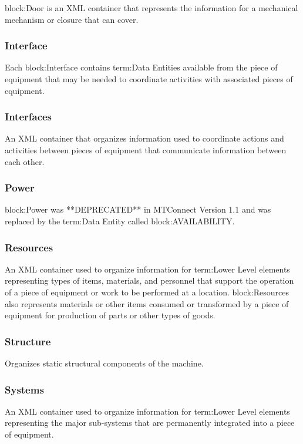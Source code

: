 {block:Door} is an XML container that represents the information for a mechanical mechanism or closure that can cover.

\FloatBarrier

\subsubsection{Interface}
  \label{sec:Interface}


Each {block:Interface} contains {term:Data Entities} available from the piece of equipment that may be needed to coordinate activities with associated pieces of equipment.

\FloatBarrier

\subsubsection{Interfaces}
  \label{sec:Interfaces}


An XML container that organizes information used to coordinate actions and activities between pieces of equipment that communicate information between each other.

\FloatBarrier

\subsubsection{Power}
  \label{sec:Power}


{block:Power} was **DEPRECATED** in MTConnect Version 1.1 and was replaced by the {term:Data Entity} called {block:AVAILABILITY}.

\FloatBarrier

\subsubsection{Resources}
  \label{sec:Resources}


An XML container used to organize information for {term:Lower Level} elements representing types of items, materials, and personnel that support the operation of a piece of equipment or work to be performed at a location. {block:Resources} also represents materials or other items consumed or transformed by a piece of equipment for production of parts or other types of goods.

\FloatBarrier

\subsubsection{Structure}
  \label{sec:Structure}


Organizes static structural components of the machine.

\FloatBarrier

\subsubsection{Systems}
  \label{sec:Systems}


An XML container used to organize information for {term:Lower Level} elements representing the major sub-systems that are permanently integrated into a piece of equipment.

\FloatBarrier
